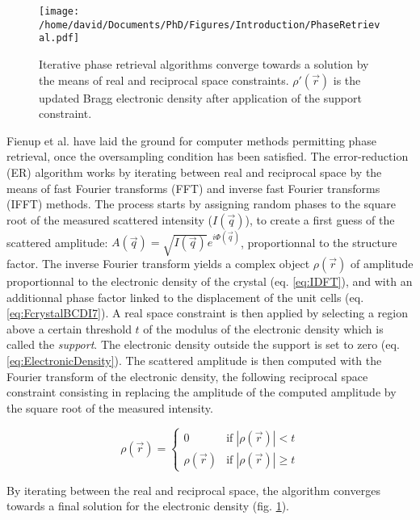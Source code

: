 \begin{figure}[!htb]
   \centering
   \texttt{[image: /home/david/Documents/PhD/Figures/Introduction/PhaseRetrieval.pdf]}
   \caption{
   Iterative phase retrieval algorithms converge towards a solution by the means of real and reciprocal space constraints.
   $\rho'(\vec{r})$ is the updated Bragg electronic density after application of the support constraint.
   }
   \label{fig:PRAlgo}
\end{figure}

Fienup et al. \parencite*{Fienup1978, Fienup1982, Fienup1986} have laid the ground for computer methods permitting phase retrieval, once the oversampling condition has been satisfied.
The error-reduction (ER) algorithm works by iterating between real and reciprocal space by the means of fast Fourier transforms (FFT) and inverse fast Fourier transforms (IFFT) methods.
The process starts by assigning random phases to the square root of the measured scattered intensity ($I(\vec{q})$), to create a first guess of the scattered amplitude: $A(\vec{q}) = \sqrt{I(\vec{q})}e^{i\Phi(\vec{q})}$, proportionnal to the structure factor.
The inverse Fourier transform yields a complex object $\rho(\vec{r})$ of amplitude proportionnal to the electronic density of the crystal (eq. \ref{eq:IDFT}), and with an additionnal phase factor linked to the displacement of the unit cells (eq. \ref{eq:FcrystalBCDI7}).
A real space constraint is then applied by selecting a region above a certain threshold $t$ of the modulus of the electronic density which is called the \textit{support}.
The electronic density outside the support is set to zero (eq. \ref{eq:ElectronicDensity}).
The scattered amplitude is then computed with the Fourier transform of the electronic density, the following reciprocal space constraint consisting in replacing the amplitude of the computed amplitude by the square root of the measured intensity.

\begin{equation}
    \label{eq:ElectronicDensity}
    \rho(\vec{r}) =
        \begin{cases}
            0  & \text{if} \; |\rho(\vec{r})| < t \\
            \rho(\vec{r}) & \text{if}  \; |\rho(\vec{r})| \geq t
        \end{cases}
\end{equation}

By iterating between the real and reciprocal space, the algorithm converges towards a final solution for the electronic density (fig. \ref{fig:PRAlgo}).

